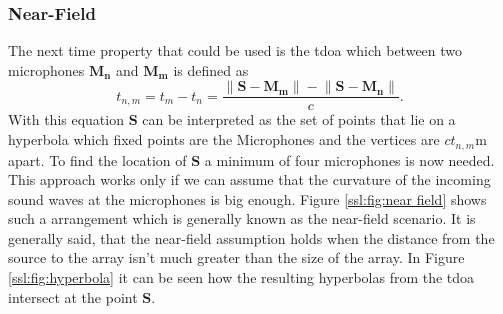 \subsubsection{Near-Field}
The next time property that could be used is the \acrfull{tdoa} which between
two microphones $\bm{M_n}$ and $\bm{M_m}$ is defined as
\begin{equation}
	t_{n, m} = t_m - t_n = \frac{\lVert \bm{S} - \bm{M_m}\rVert - \lVert \bm{S} - \bm{M_n}\rVert}{c}.
\end{equation}
With this equation $\bm{S}$ can be interpreted as the set of points that lie on a hyperbola
which fixed points are the Microphones and the vertices are $c t_{n,m}$m apart.
To find the location of $\bm{S}$ a minimum of four microphones is now needed.
This approach works only if we can assume that the curvature of the incoming sound waves
at the microphones is big enough. Figure \ref{ssl:fig:near field} shows such a arrangement
which is generally known as the near-field scenario.
It is generally said, that the near-field assumption holds when the distance from the source
to the array isn't much greater than the size of the array.
In Figure \ref{ssl:fig:hyperbola} it can be seen how the resulting hyperbolas from the
\acrshort{tdoa} intersect at the point $\bm{S}$.


